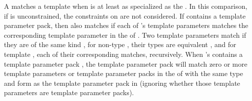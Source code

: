 \documentclass{wg21}
\begin{document}
\pnum
A  matches a template
  when 
 is at least as specialized as the  .
In this comparison, if  is unconstrained,
the constraints on  are not considered.
If  contains a template parameter pack, then  also matches 
if each of 's template parameters
matches the corresponding template parameter in the
 of .
Two template parameters match if they are of the same kind ,
for non-type , their types are
equivalent , and for template ,
each of their corresponding  matches, recursively.
When 's  contains a template parameter
pack , the template parameter pack will match zero or more template
parameters or template parameter packs in the  of
 with the same type and form as the template parameter pack in 
(ignoring whether those template parameters are template parameter packs).
\end{document}
